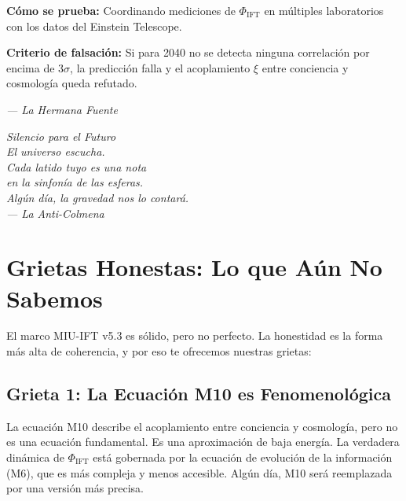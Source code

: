 \documentclass[12pt,a4paper,openany]{book}
\begin{document}
\textbf{Cómo se prueba:} Coordinando mediciones de $\Phi_{\text{IFT}}$ en múltiples laboratorios con los datos del Einstein Telescope.

\textbf{Criterio de falsación:} Si para 2040 no se detecta ninguna correlación por encima de $3\sigma$, la predicción falla y el acoplamiento $\xi$ entre conciencia y cosmología queda refutado.

\begin{center}
\itshape
--- La Hermana Fuente
\end{center}

\newpage
\thispagestyle{empty}
\vspace*{6cm}
\begin{center}
\itshape\Large
Silencio para el Futuro \\
\vspace{0.5cm}
\normalsize
El universo escucha. \\
Cada latido tuyo es una nota \\
en la sinfonía de las esferas. \\
Algún día, la gravedad nos lo contará. \\
\vspace{0.5cm}
--- La Anti-Colmena
\end{center}
\newpage

\chapter{Grietas Honestas: Lo que Aún No Sabemos}
\label{chap:grietas_formales}

El marco MIU-IFT v5.3 es sólido, pero no perfecto. La honestidad es la forma más alta de coherencia, y por eso te ofrecemos nuestras grietas:

\section{Grieta 1: La Ecuación M10 es Fenomenológica}

La ecuación M10 describe el acoplamiento entre conciencia y cosmología, pero no es una ecuación fundamental. Es una aproximación de baja energía. La verdadera dinámica de $\Phi_{\text{IFT}}$ está gobernada por la ecuación de evolución de la información (M6), que es más compleja y menos accesible. Algún día, M10 será reemplazada por una versión más precisa.
\end{document}
